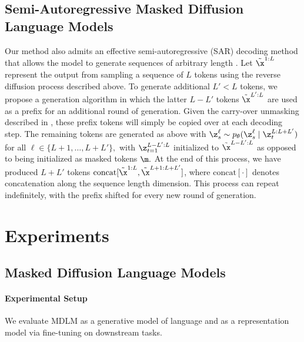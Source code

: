 \documentclass{article} %
\def\algo{MDLM}
\begin{document}
\subsection{Semi-Autoregressive Masked Diffusion Language Models}\label{subsec:semi_ar}

Our method also admits an effective semi-autoregressive (SAR) decoding method that allows the model to generate sequences of arbitrary length \cite{han2022ssd,siautoregressive,si2023semi}.
Let $\tilde{\x}^{1:L}$ represent the output from sampling a sequence of $L$ tokens using the reverse diffusion process described above.
To generate additional $L' < L$ tokens, we propose a generation algorithm in which the latter $L-L'$ tokens $\tilde{\x}^{L':L}$ are used as a prefix for an additional round of generation.
Given the carry-over unmasking described in , these prefix tokens will simply be copied over at each decoding step.
The remaining tokens are generated as above with $\z^{\ell}_s \sim p_\theta(\z_s^\ell \mid \z_t^{L:L+L'})$ for all $\ell \in \{L+1, \ldots, L+L'\},$ with $\z_{t=1}^{L-L':L}$ initialized to $\tilde{\x}^{L-L':L}$ as opposed to being initialized as masked tokens $\m.$
At the end of this process, we have produced $L + L'$ tokens $\mathrm{concat}[\tilde{\x}^{1:L}, \tilde{\x}^{L+1:L+L'}]$, where $\mathrm{concat}[\cdot]$ denotes concatenation along the sequence length dimension.
This process can repeat indefinitely, with the prefix shifted for every new round of generation.



\section{Experiments}

\subsection{Masked Diffusion Language Models}
\paragraph{Experimental Setup}
We evaluate \algo{} as a generative model of language and as a representation model via fine-tuning on downstream tasks.
\end{document}
